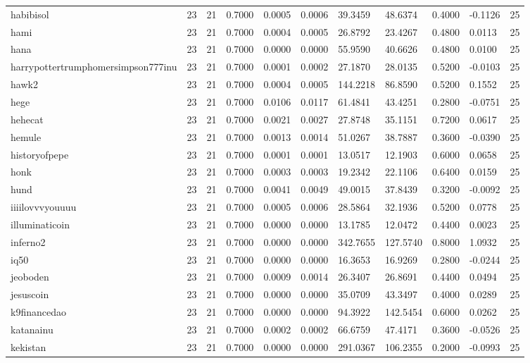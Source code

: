 \begin{table}[htbp]
\begin{tabular}{lllllllllll}
habibisol & 23 & 21 & 0.7000 & 0.0005 & 0.0006 & 39.3459 & 48.6374 & 0.4000 & -0.1126 & 25 \\
hami & 23 & 21 & 0.7000 & 0.0004 & 0.0005 & 26.8792 & 23.4267 & 0.4800 & 0.0113 & 25 \\
hana & 23 & 21 & 0.7000 & 0.0000 & 0.0000 & 55.9590 & 40.6626 & 0.4800 & 0.0100 & 25 \\
harrypottertrumphomersimpson777inu & 23 & 21 & 0.7000 & 0.0001 & 0.0002 & 27.1870 & 28.0135 & 0.5200 & -0.0103 & 25 \\
hawk2 & 23 & 21 & 0.7000 & 0.0004 & 0.0005 & 144.2218 & 86.8590 & 0.5200 & 0.1552 & 25 \\
hege & 23 & 21 & 0.7000 & 0.0106 & 0.0117 & 61.4841 & 43.4251 & 0.2800 & -0.0751 & 25 \\
hehecat & 23 & 21 & 0.7000 & 0.0021 & 0.0027 & 27.8748 & 35.1151 & 0.7200 & 0.0617 & 25 \\
hemule & 23 & 21 & 0.7000 & 0.0013 & 0.0014 & 51.0267 & 38.7887 & 0.3600 & -0.0390 & 25 \\
historyofpepe & 23 & 21 & 0.7000 & 0.0001 & 0.0001 & 13.0517 & 12.1903 & 0.6000 & 0.0658 & 25 \\
honk & 23 & 21 & 0.7000 & 0.0003 & 0.0003 & 19.2342 & 22.1106 & 0.6400 & 0.0159 & 25 \\
hund & 23 & 21 & 0.7000 & 0.0041 & 0.0049 & 49.0015 & 37.8439 & 0.3200 & -0.0092 & 25 \\
iiiilovvvyouuuu & 23 & 21 & 0.7000 & 0.0005 & 0.0006 & 28.5864 & 32.1936 & 0.5200 & 0.0778 & 25 \\
illuminaticoin & 23 & 21 & 0.7000 & 0.0000 & 0.0000 & 13.1785 & 12.0472 & 0.4400 & 0.0023 & 25 \\
inferno2 & 23 & 21 & 0.7000 & 0.0000 & 0.0000 & 342.7655 & 127.5740 & 0.8000 & 1.0932 & 25 \\
iq50 & 23 & 21 & 0.7000 & 0.0000 & 0.0000 & 16.3653 & 16.9269 & 0.2800 & -0.0244 & 25 \\
jeoboden & 23 & 21 & 0.7000 & 0.0009 & 0.0014 & 26.3407 & 26.8691 & 0.4400 & 0.0494 & 25 \\
jesuscoin & 23 & 21 & 0.7000 & 0.0000 & 0.0000 & 35.0709 & 43.3497 & 0.4000 & 0.0289 & 25 \\
k9financedao & 23 & 21 & 0.7000 & 0.0000 & 0.0000 & 94.3922 & 142.5454 & 0.6000 & 0.0262 & 25 \\
katanainu & 23 & 21 & 0.7000 & 0.0002 & 0.0002 & 66.6759 & 47.4171 & 0.3600 & -0.0526 & 25 \\
kekistan & 23 & 21 & 0.7000 & 0.0000 & 0.0000 & 291.0367 & 106.2355 & 0.2000 & -0.0993 & 25 \\

\end{tabular}
\end{table}
